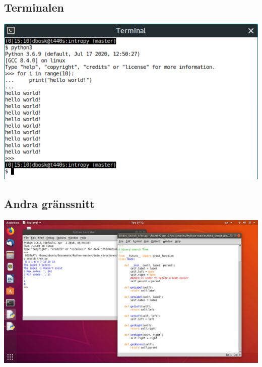 \subsection{Terminalen}

\begin{frame}
  \includegraphics[width=\columnwidth]{figs/python-terminal.png}
\end{frame}


\subsection{Andra gränssnitt}

\begin{frame}
  \centering
  \includegraphics[width=\columnwidth]{figs/idle.jpg}
\end{frame}

